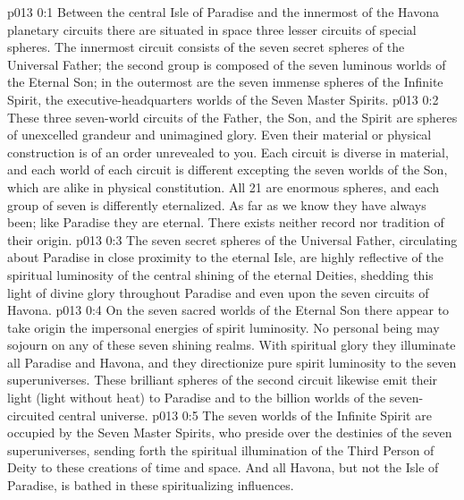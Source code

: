 \author{Perfector of Wisdom}
\vs p013 0:1 Between the central Isle of Paradise and the innermost of the Havona planetary circuits there are situated in space three lesser circuits of special spheres. The innermost circuit consists of the seven secret spheres of the Universal Father; the second group is composed of the seven luminous worlds of the Eternal Son; in the outermost are the seven immense spheres of the Infinite Spirit, the executive\hyp{}headquarters worlds of the Seven Master Spirits.
\vs p013 0:2 These three seven\hyp{}world circuits of the Father, the Son, and the Spirit are spheres of unexcelled grandeur and unimagined glory. Even their material or physical construction is of an order unrevealed to you. Each circuit is diverse in material, and each world of each circuit is different excepting the seven worlds of the Son, which are alike in physical constitution. All 21 are enormous spheres, and each group of seven is differently eternalized. As far as we know they have always been; like Paradise they are eternal. There exists neither record nor tradition of their origin.
\vs p013 0:3 \pc The seven secret spheres of the Universal Father, circulating about Paradise in close proximity to the eternal Isle, are highly reflective of the spiritual luminosity of the central shining of the eternal Deities, shedding this light of divine glory throughout Paradise and even upon the seven circuits of Havona.
\vs p013 0:4 \pc On the seven sacred worlds of the Eternal Son there appear to take origin the impersonal energies of spirit luminosity. No personal being may sojourn on any of these seven shining realms. With spiritual glory they illuminate all Paradise and Havona, and they directionize pure spirit luminosity to the seven superuniverses. These brilliant spheres of the second circuit likewise emit their light (light without heat) to Paradise and to the billion worlds of the seven\hyp{}circuited central universe.
\vs p013 0:5 \pc The seven worlds of the Infinite Spirit are occupied by the Seven Master Spirits, who preside over the destinies of the seven superuniverses, sending forth the spiritual illumination of the Third Person of Deity to these creations of time and space. And all Havona, but not the Isle of Paradise, is bathed in these spiritualizing influences.
